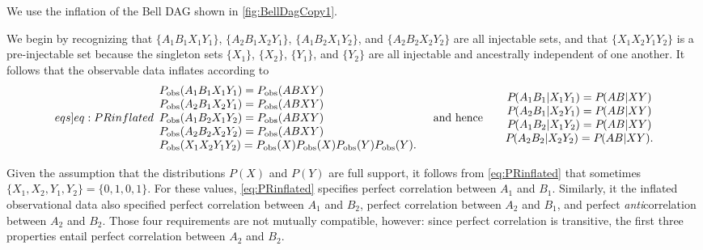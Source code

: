 We use the inflation of the Bell DAG shown in \cref{fig:BellDagCopy1}.

We begin by recognizing that $\{A_1 B_1 X_1 Y_1\}$, $\{A_2 B_1 X_2 Y_1\}$, $\{A_1 B_2 X_1 Y_2\}$, and $\{A_2 B_2 X_2 Y_2\}$ are all injectable sets, and that $\{X_1 X_2 Y_1 Y_2\}$ is a pre-injectable set because the singleton sets $\{X_1\}$, $\{X_2\}$, $\{Y_1\}$, and $\{Y_2\}$ are all injectable and ancestrally independent of one another.  It follows that the observable data inflates according to
\begin{align}\begin{split}\label[eqs]{eq:PRinflated}\begin{array}{l}
\pdf[\text{obs}]{A_1 B_1 X_1 Y_1}=\pdf[\text{obs}]{A B X Y}\\%
\pdf[\text{obs}]{A_2 B_1 X_2 Y_1}=\pdf[\text{obs}]{A B X Y}\\%
\pdf[\text{obs}]{A_1 B_2 X_1 Y_2}=\pdf[\text{obs}]{A B X Y}\\%
\pdf[\text{obs}]{A_2 B_2 X_2 Y_2}=\pdf[\text{obs}]{A B X Y}\\%
\pdf[\text{obs}]{X_1 X_2 Y_1 Y_2}=\pdf[\text{obs}]{X}\pdf[\text{obs}]{X}\pdf[\text{obs}]{Y}\pdf[\text{obs}]{Y}.%
\end{array}\quad\text{and hence}\quad\begin{matrix}
&\pdf{A_1 B_1 |X_1 Y_1}=\pdf{A B |X Y}\\%
&\pdf{A_2 B_1 |X_2 Y_1}=\pdf{A B |X Y}\\%
&\pdf{A_1 B_2 |X_1 Y_2}=\pdf{A B |X Y}\\%
&\pdf{A_2 B_2 |X_2 Y_2}=\pdf{A B |X Y}.%
\end{matrix}\end{split}\end{align}

Given the assumption that the distributions $P(X)$ and $P(Y)$ are full support, it follows from \cref{eq:PRinflated} that sometimes $\{X_1, X_2, Y_1, Y_2\}=\{0, 1, 0, 1\}$.  
For these values, \cref{eq:PRinflated} specifies perfect correlation between $A_1$ and $B_1$.  Similarly, it the inflated observational data also specified perfect correlation between $A_1$ and $B_2$, perfect correlation between $A_2$ and $B_1$, and perfect \emph{anti}correlation between $A_2$ and $B_2$. Those four requirements are not mutually compatible, however: since perfect correlation is transitive, the first three properties entail perfect correlation between $A_2$ and $B_2$. 

